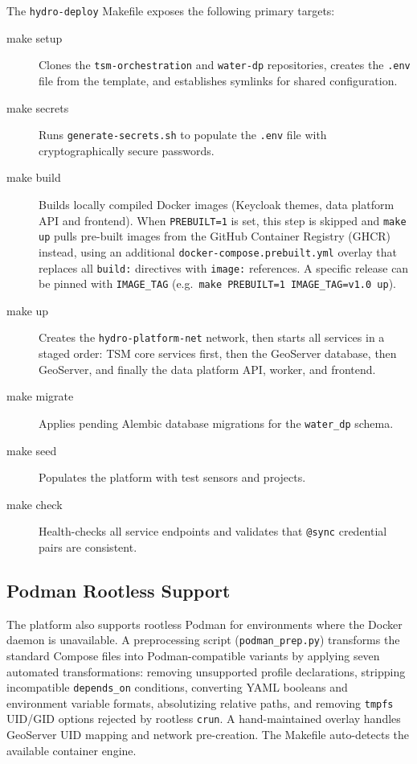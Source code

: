 The \texttt{hydro-deploy} Makefile exposes the following primary targets:

\begin{description}
  \item[make setup] Clones the \texttt{tsm-orchestration} and \texttt{water-dp} repositories,
    creates the \texttt{.env} file from the template, and establishes symlinks for shared
    configuration.
  \item[make secrets] Runs \texttt{generate-secrets.sh} to populate the \texttt{.env} file
    with cryptographically secure passwords.
  \item[make build] Builds locally compiled Docker images (Keycloak themes, data platform
    API and frontend). When \texttt{PREBUILT=1} is set, this step is skipped and
    \texttt{make up} pulls pre-built images from the GitHub Container Registry (GHCR)
    instead, using an additional \texttt{docker-compose.prebuilt.yml} overlay that
    replaces all \texttt{build:} directives with \texttt{image:} references.
    A specific release can be pinned with \texttt{IMAGE\_TAG}
    (e.g.\ \texttt{make PREBUILT=1 IMAGE\_TAG=v1.0 up}).
  \item[make up] Creates the \texttt{hydro-platform-net} network, then starts all services
    in a staged order: TSM core services first, then the GeoServer database, then
    GeoServer, and finally the data platform API, worker, and frontend.
  \item[make migrate] Applies pending Alembic database migrations for the \texttt{water\_dp}
    schema.
  \item[make seed] Populates the platform with test sensors and projects.
  \item[make check] Health-checks all service endpoints and validates that \texttt{@sync}
    credential pairs are consistent.
\end{description}

\subsection{Podman Rootless Support}
\label{sec:arch-deploy-podman}

The platform also supports rootless Podman for environments where the Docker daemon is
unavailable. A preprocessing script (\texttt{podman\_prep.py}) transforms the standard
Compose files into Podman-compatible variants by applying seven automated transformations:
removing unsupported profile declarations, stripping incompatible \texttt{depends\_on}
conditions, converting YAML booleans and environment variable formats, absolutizing
relative paths, and removing \texttt{tmpfs} UID/GID options rejected by rootless
\texttt{crun}. A hand-maintained overlay handles GeoServer UID mapping and network
pre-creation. The Makefile auto-detects the available container engine.
